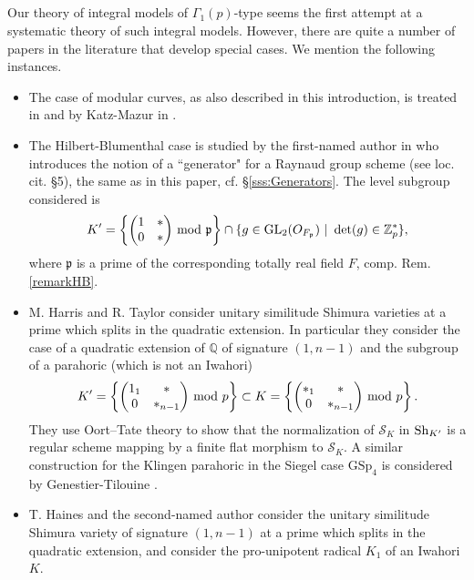 \documentclass[reqno, 10pt]{amsart}
\newcommand{\BQ}{\ensuremath{\mathbb {Q}}\xspace}
\newcommand{\BZ}{\ensuremath{\mathbb {Z}}\xspace}
\newcommand{\CS}{\ensuremath{\mathcal {S}}\xspace}
\newcommand{\GL}{\mathrm{GL}}
\newcommand{\GSp}{\mathrm{GSp}}
\theoremstyle{definition}
\numberwithin{equation}{subsection}
\numberwithin{subsubsection}{subsection}
\begin{document}
\subsection{}  Our theory of integral models of $\Gamma_1(p)$-type seems the first attempt at a systematic theory of such integral models. However, there are quite a number of papers in the literature that develop special cases. We mention the following instances. 
 
 \begin{itemize}
 \item The case of modular curves, as also described in this introduction, is treated in \cite{DeligneRa} and by Katz-Mazur in \cite{KatzMazur}.
 \item The Hilbert-Blumenthal case is studied by the first-named author in \cite{P95} who introduces the notion of a ``generator" for a Raynaud group scheme (see loc. cit. \S 5), the same as in this paper, cf. \S \ref{sss:Generators}. The level subgroup considered is
 \[
 K'=\left\{\begin{pmatrix}1 &*\\ 0&  *\end{pmatrix}\,{\rm mod}\ \mathfrak p  \right\}\cap \{g\in \GL_2(O_{F_{\mathfrak p}})\ |\ \det(g)\in \BZ_p^*\},
 \]
 where $\mathfrak p$ is a prime of the corresponding totally real field $F$, comp. Rem. \ref{remarkHB}.
 \item  M. Harris and R. Taylor \cite{HT} consider  unitary similitude Shimura varieties  at a prime which splits in the quadratic extension. In particular they consider the case of a quadratic extension of $\BQ$ of signature $(1, n-1)$ and the subgroup of a parahoric (which is not an Iwahori)
 \[
K'=\left\{\begin{pmatrix}1_1 &*\\ 0& *_{n-1}\end{pmatrix}\,{\rm mod}\ p  \right\}\subset K=\left\{\begin{pmatrix}*_1 &*\\ 0& *_{n-1}\end{pmatrix}\,{\rm mod}\ p  \right\} .
\]
They use Oort--Tate theory to show that the normalization of $\CS_K$ in ${\rm Sh}_{K'}$ is a regular scheme mapping by a finite flat morphism to $\CS_K$. 
A similar construction for the Klingen parahoric in the Siegel case $\GSp_4$ is considered by Genestier-Tilouine \cite{GenTi}.
\item T. Haines and the second-named author \cite{HR} consider the unitary similitude Shimura variety of signature $(1, n-1)$ at a prime which splits in the quadratic extension, and consider the pro-unipotent radical $K_1$  of an Iwahori $K$.

\end{itemize}
\end{document}
